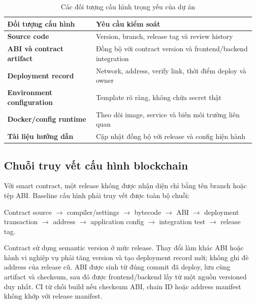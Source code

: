 \begin{table}[H]
\centering
\caption{Các đối tượng cấu hình trọng yếu của dự án}
\label{tab:configuration-items}
\begin{tabularx}{\textwidth}{| >{\bfseries}p{4cm} | X |}
\hline
Đối tượng cấu hình & Yêu cầu kiểm soát \\
\hline
Source code & Version, branch, release tag và review history \\ \hline
ABI và contract artifact & Đồng bộ với contract version và frontend/backend integration \\ \hline
Deployment record & Network, address, verify link, thời điểm deploy và owner \\ \hline
Environment configuration & Template rõ ràng, không chứa secret thật \\ \hline
Docker/config runtime & Theo dõi image, service và biến môi trường liên quan \\ \hline
Tài liệu hướng dẫn & Cập nhật đồng bộ với release và config hiện hành \\
\hline
\end{tabularx}
\end{table}

\iffalse
\subsection{Chuỗi truy vết cấu hình blockchain}

Với smart contract, một release không được nhận diện chỉ bằng tên branch hoặc tệp ABI. Baseline cấu hình phải truy vết được toàn bộ chuỗi:

\begin{center}
Contract source $\rightarrow$ compiler/settings $\rightarrow$ bytecode $\rightarrow$ ABI $\rightarrow$ deployment transaction $\rightarrow$ address $\rightarrow$ application config $\rightarrow$ integration test $\rightarrow$ release tag.
\end{center}

Contract sử dụng semantic version ở mức release. Thay đổi làm khác ABI hoặc hành vi nghiệp vụ phải tăng version và tạo deployment record mới; không ghi đè address của release cũ. ABI được sinh từ đúng commit đã deploy, lưu cùng artifact và checksum, sau đó được frontend/backend lấy từ một nguồn versioned duy nhất. CI từ chối build nếu checksum ABI, chain ID hoặc address manifest không khớp với release manifest.

